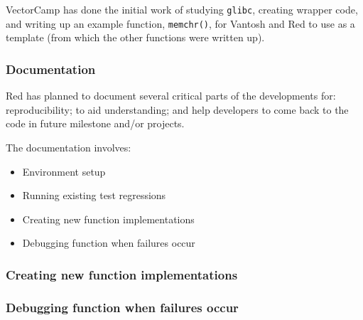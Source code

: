 VectorCamp has done the initial work of studying \texttt{glibc},
creating wrapper code, and writing up an example function, \texttt{memchr()},
for Vantosh and Red to use as a template (from which the other functions were
written up).

\subsubsection{Documentation}

Red has planned to document several critical parts of the developments for:
reproducibility; to aid understanding; and help developers to come back to
the code in future milestone and/or projects.

The documentation involves:

\begin{itemize}
  \item Environment setup
  \item Running existing test regressions
  \item Creating new function implementations
  \item Debugging function when failures occur
\end{itemize}





\subsubsection{Creating new function implementations}

\subsubsection{Debugging function when failures occur}
